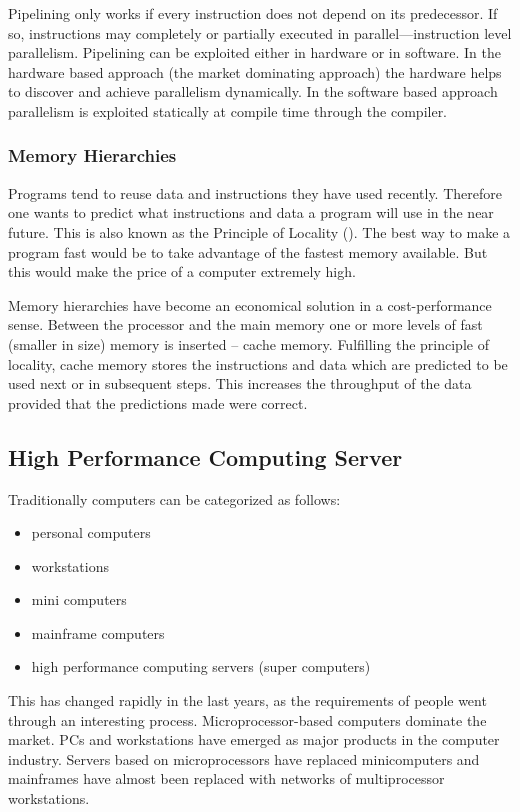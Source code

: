 Pipelining only works if every instruction does not depend on its
predecessor. If so, instructions may completely or partially executed
in parallel---instruction level parallelism.
Pipelining can be
exploited either in hardware or in software. In the hardware based
approach (the market dominating approach) the hardware helps to
discover and achieve parallelism dynamically. In the software based
approach parallelism is exploited statically at compile time through the
compiler. 

\subsubsection{Memory Hierarchies}

Programs tend to reuse data and instructions they have used
recently. Therefore one wants to predict what instructions and data a
program will use in the near future. This is also known as the
Principle of Locality (\cite{C1quant07}). The best way to
make a program fast would be to take advantage of the fastest memory
available. But this would make the price of a computer extremely
high.

Memory hierarchies have become an economical solution in a
cost-performance sense. Between the processor and the main memory one
or more levels of fast (smaller in size) memory is inserted -- cache
memory. Fulfilling the principle of locality, cache memory stores the
instructions and data which are predicted to be used next or in
subsequent steps. This increases the throughput of the data provided that
the predictions made were correct.

\subsection{High Performance Computing Server}

Traditionally computers can be categorized as follows:
\begin{itemize}
\item personal computers
\item workstations
\item mini computers
\item mainframe computers
\item high performance computing servers (super computers)
\end{itemize}

This has changed rapidly in the last years, as the requirements of
people went through an interesting process. Microprocessor-based
computers dominate the market. PCs and workstations have emerged as
major products in the computer industry. Servers based on
microprocessors have replaced minicomputers and mainframes have almost
been replaced with networks of multiprocessor workstations.

